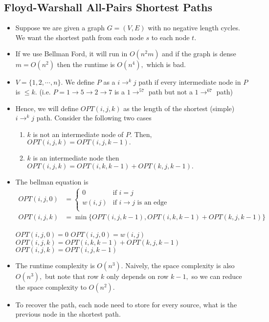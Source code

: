 \documentclass[a4paper,12pt]{article}
\begin{document}
\subsection{Floyd-Warshall All-Pairs Shortest Paths}
\begin{itemize}
    \item Suppose we are given a graph $G=(V,E)$ with no negative length cycles. We want the shortest path from each node $s$ to each node $t.$ 
    \item If we use Bellman Ford, it will run in $O(n^2m)$ and if the graph is dense $m=O(n^2)$ then the runtime is $O(n^4),$ which is bad.
    \item $V=\{1,2,\cdots,n\}.$ We define $P$ as a $i\to^kj$ path if every intermediate node in $P$ is $\leq k.$ (i.e. $P=1\to 5\to 2\to 7$ is a $1\to^57$ path but not a $1\to^67$ path)
    \item Hence, we will define $OPT(i,j,k)$ as the length of the shortest (simple) $i\to^kj$ path. Consider the following two cases \begin{enumerate}
        \item $k$ is not an intermediate node of $P.$ Then, $OPT(i,j,k)=OPT(i,j,k-1).$
        \item $k$ is an intermediate node then $OPT(i,j,k)=OPT(i,k,k-1)+OPT(k,j,k-1).$
    \end{enumerate}
    \item The bellman equation is \begin{align}
        OPT(i,j,0)&=\begin{cases}
            0&\text{if }i=j\\
            w(i,j)&\text{if }i\to j\text{ is an edge}\\
        \end{cases}\\
        OPT(i,j,k)&=\min\{OPT(i,j,k-1),OPT(i,k,k-1)+OPT(k,j,k-1)\}
    \end{align}
    \begin{algorithmic}[1]
                    \State $OPT(i,j,0)=0$
                \Else
                    \State $OPT(i,j,0)=w(i,j)$
                \EndIf
            \EndFor
        \EndFor
                        \State $OPT(i,j,k)=OPT(i,k,k-1)+OPT(k,j,k-1)$
                    \Else
                        \State $OPT(i,j,k)=OPT(i,j,k-1)$
                    \EndIf
                \EndFor
            \EndFor
        \EndFor
    \end{algorithmic}
    \item The runtime complexity is $O(n^3).$ Naively, the space complexity is also $O(n^3),$ but note that row $k$ only depends on row $k-1,$ so we can reduce the space complexity to $O(n^2).$
    \item To recover the path, each node need to store for every source, what is the previous node in the shortest path.
\end{itemize}
\end{document}
